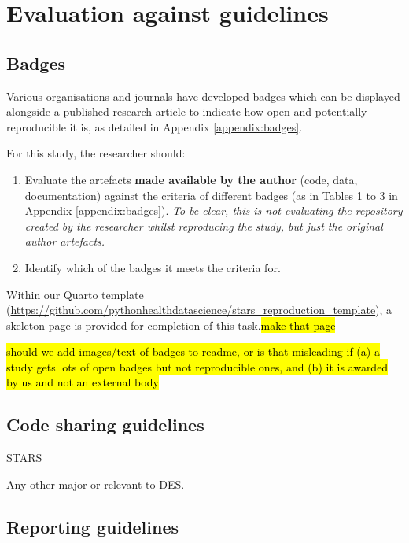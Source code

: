 \section{Evaluation against guidelines}

\subsection{Badges} \label{sec:badges}
\timeno

Various organisations and journals have developed badges which can be displayed alongside a published research article to indicate how open and potentially reproducible it is, as detailed in Appendix \ref{appendix:badges}.

For this study, the researcher should:
\begin{enumerate}
    \item Evaluate the artefacts \textbf{made available by the author} (code, data, documentation) against the criteria of different badges (as in Tables 1 to 3 in Appendix \ref{appendix:badges}). \textit{To be clear, this is not evaluating the repository created by the researcher whilst reproducing the study, but just the original author artefacts.}
    \item Identify which of the badges it meets the criteria for.
\end{enumerate}

Within our Quarto template (\url{https://github.com/pythonhealthdatascience/stars_reproduction_template}), a skeleton page is provided for completion of this task.\hl{make that page}

\hl{should we add images/text of badges to readme, or is that misleading if (a) a study gets lots of open badges but not reproducible ones, and (b) it is awarded by us and not an external body}

\subsection{Code sharing guidelines} \label{sec:code}
\timeno

STARS

Any other major or relevant to DES.

\subsection{Reporting guidelines} \label{sec:reporting}
\timeno


